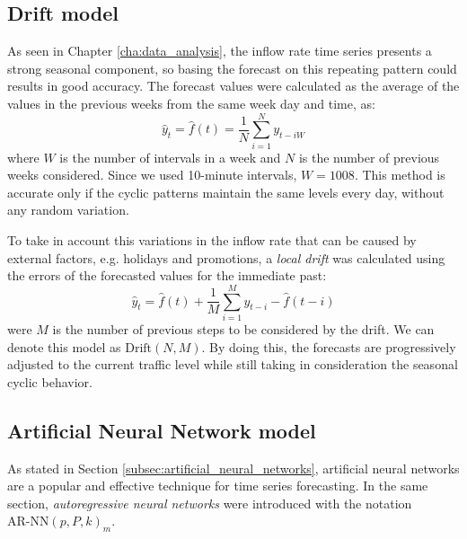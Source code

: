 \subsection{Drift model}
\label{subsec:drift_model}

As seen in Chapter \ref{cha:data_analysis}, the inflow rate time series presents a strong seasonal component, so basing the forecast on this repeating pattern could results in good accuracy. The forecast values were calculated as the average of the values in the previous weeks from the same week day and time, as:
\begin{equation}
  \hat{y}_t = \hat{f}(t) = \frac{1}{N} \sum_{i=1}^{N} y_{t-iW}
\end{equation}
where \( W \) is the number of intervals in a week and \( N \) is the number of previous weeks considered. Since we used 10-minute intervals, \( W = 1008 \). This method is accurate only if the cyclic patterns maintain the same levels every day, without any random variation.

To take in account this variations in the inflow rate that can be caused by external factors, e.g. holidays and promotions, a \emph{local drift} was calculated using the errors of the forecasted values for the immediate past:
\begin{equation}
  \hat{y}_t = \hat{f}(t) + \frac{1}{M} \sum_{i=1}^{M} y_{t-i} - \hat{f}(t-i)
\end{equation}
were \( M \) is the number of previous steps to be considered by the drift. We can denote this model as \( \text{Drift}(N, M) \). By doing this, the forecasts are progressively adjusted to the current traffic level while still taking in consideration the seasonal cyclic behavior.

\subsection{Artificial Neural Network model}
\label{subsec:artificial_neural_network_model}

As stated in Section \ref{subsec:artificial_neural_networks}, artificial neural networks are a popular and effective technique for time series forecasting. In the same section, \emph{autoregressive neural networks} were introduced with the notation \( \text{AR-NN}(p, P, k)_m \).

